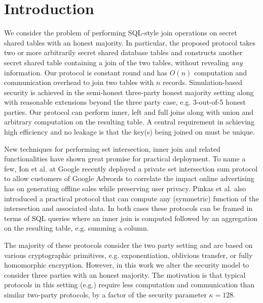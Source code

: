 \section{Introduction}

We consider the problem of performing SQL-style join operations on secret shared tables with an honest majority. In particular, the proposed protocol takes two or more arbitrarily secret shared database tables and constructs another secret shared table containing a join of the two tables, without revealing \emph{any}  information. Our protocol is constant round and  has $O(n)$ computation and communication  overhead to join two tables with $n$ records. Simulation-based security is achieved in the semi-honest three-party honest majority setting along with reasonable extensions beyond the three party case, e.g. 3-out-of-5 honest parties. Our protocol can perform inner, left and full joins along with union and arbitrary computation on the resulting table. A central requirement in achieving high efficiency and no leakage is that the key(s) being joined on must be unique. 

New techniques \cite{usenix:PSZ14,USENIX:PSSZ15,PSZ16,CCS:KKRT16,PSWW18,CLR17,CHLR18,cryptoeprint:2017:738,RA17,KLSAP17,OOS17,KMPRT17} for performing set intersection, inner join and related functionalities have shown great promise for practical deployment. To name a few, Ion et al. at Google recently deployed a private set intersection sum protocol\cite{cryptoeprint:2017:738} to allow customers of Google Adwords to correlate the impact online advertising has on generating offline sales while preserving user privacy. Pinkas et al. \cite{PSWW18} also introduced a practical protocol that can compute any (symmetric) function of the intersection and associated data. In both cases these protocols can be framed in terms of SQL queries where an inner join is computed followed by an aggregation on the resulting table, e.g. summing a column.  

The majority of these protocols consider the two party setting and are based on various cryptographic primitives, e.g. exponentiation\cite{cryptoeprint:2017:738}, oblivious transfer\cite{PSWW18}, or fully homomorphic encryption\cite{CLR17}. However, in this work we alter the security model to consider three parties with an honest majority. The motivation is that typical protocols in this setting (e.g.\cite{highthroughput}) require less computation and communication than similar two-party protocols, by a factor of the security parameter $\kappa=128$.

